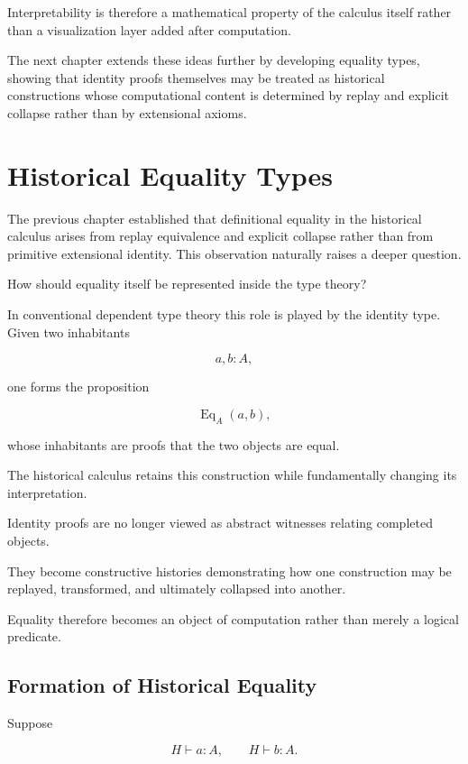 \documentclass[12pt,oneside]{article}
\theoremstyle{definition}
\theoremstyle{remark}
\begin{document}
Interpretability is therefore a mathematical property of the calculus itself
rather than a visualization layer added after computation.

The next chapter extends these ideas further by developing equality types,
showing that identity proofs themselves may be treated as historical
constructions whose computational content is determined by replay and explicit
collapse rather than by extensional axioms.

\section{Historical Equality Types}

The previous chapter established that definitional equality in the historical
calculus arises from replay equivalence and explicit collapse rather than from
primitive extensional identity. This observation naturally raises a deeper
question.

How should equality itself be represented inside the type theory?

In conventional dependent type theory this role is played by the identity type.
Given two inhabitants

\[
a,b:A,
\]

one forms the proposition

\[
\operatorname{Eq}_A(a,b),
\]

whose inhabitants are proofs that the two objects are equal.

The historical calculus retains this construction while fundamentally changing
its interpretation.

Identity proofs are no longer viewed as abstract witnesses relating completed
objects.

They become constructive histories demonstrating how one construction may be
replayed, transformed, and ultimately collapsed into another.

Equality therefore becomes an object of computation rather than merely a logical
predicate.

\subsection{Formation of Historical Equality}

Suppose

\[
H
\vdash
a:A,
\qquad
H
\vdash
b:A.
\]
\end{document}
